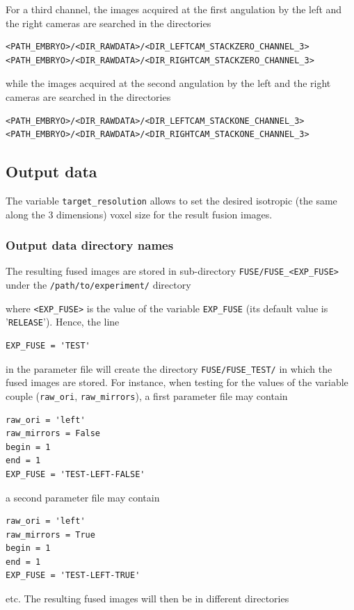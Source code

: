 For a third channel, 
the images acquired at the first angulation by the
left and the right cameras are searched in the directories
\begin{verbatim}
<PATH_EMBRYO>/<DIR_RAWDATA>/<DIR_LEFTCAM_STACKZERO_CHANNEL_3>
<PATH_EMBRYO>/<DIR_RAWDATA>/<DIR_RIGHTCAM_STACKZERO_CHANNEL_3>
\end{verbatim}
while the images acquired at the second angulation by the
left and the right cameras are searched in the directories
\begin{verbatim}
<PATH_EMBRYO>/<DIR_RAWDATA>/<DIR_LEFTCAM_STACKONE_CHANNEL_3>
<PATH_EMBRYO>/<DIR_RAWDATA>/<DIR_RIGHTCAM_STACKONE_CHANNEL_3>
\end{verbatim}



\subsection{Output data}
\label{sec:cli:fuse:output:data}

The variable \texttt{target\_resolution} allows to set the desired isotropic (the
same along the 3 dimensions) voxel size for the result fusion
images.

\subsubsection{Output data directory names}

The resulting fused images are stored in sub-directory
\texttt{FUSE/FUSE\_<EXP\_FUSE>} under the
\texttt{/path/to/experiment/} directory 

\mbox{}
\mbox{}

where \texttt{<EXP\_FUSE>} is the value of the variable \texttt{EXP\_FUSE} (its
default value is '\texttt{RELEASE}'). Hence, the line
\begin{verbatim}
EXP_FUSE = 'TEST'
\end{verbatim}
in the parameter file will create the directory
\texttt{FUSE/FUSE\_TEST/} in which the fused images are stored. For
instance, when testing for the values of the variable couple
(\texttt{raw\_ori}, \texttt{raw\_mirrors}), a first parameter file may
contain
\begin{verbatim}
raw_ori = 'left'
raw_mirrors = False
begin = 1
end = 1
EXP_FUSE = 'TEST-LEFT-FALSE'
\end{verbatim}
a second parameter file may
contain
\begin{verbatim}
raw_ori = 'left'
raw_mirrors = True
begin = 1
end = 1
EXP_FUSE = 'TEST-LEFT-TRUE'
\end{verbatim}
etc. The resulting fused images will then be in different directories

